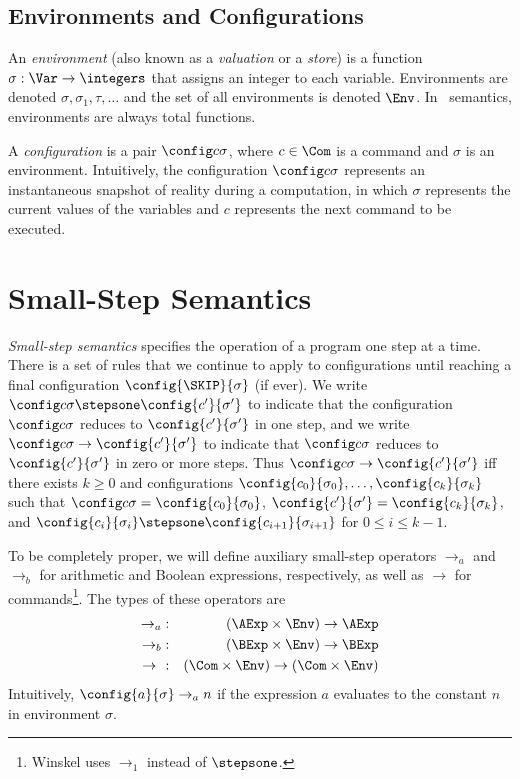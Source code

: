 \subsection{Environments and Configurations}

An \emph{environment} (also known as a \emph{valuation} or a \emph{store}) is a function $\sigma:\Var\to\integers$ that assigns an integer to each variable. Environments are denoted $\sigma,\sigma_1,\tau,\ldots$ and the set of all environments is denoted $\Env$. In \IMP\ semantics, environments are always total functions.

A \emph{configuration} is a pair $\config c\sigma$, where $c\in\Com$ is a command and $\sigma$ is an environment. Intuitively, the configuration $\config c\sigma$ represents an instantaneous snapshot of reality during a computation, in which $\sigma$ represents the current values of the variables and $c$ represents the next command to be executed.

\section{Small-Step Semantics}

\emph{Small-step semantics} specifies the operation of a program one step at a time. There is a set of rules that we continue to apply to configurations until reaching a final configuration $\config{\SKIP}{\sigma}$ (if ever). We write $\config c\sigma\stepsone\config{c'}{\sigma'}$ to indicate that the configuration $\config c\sigma$ reduces to $\config{c'}{\sigma'}$ in one step, and we write $\config c\sigma\to\config{c'}{\sigma'}$ to indicate that $\config c\sigma$ reduces to $\config{c'}{\sigma'}$ in zero or more steps. Thus $\config c\sigma\to\config{c'}{\sigma'}$ iff there exists $k\geq 0$ and configurations $\config{c_0}{\sigma_0},\ldots,\config{c_k}{\sigma_k}$ such that $\config c\sigma=\config{c_0}{\sigma_0}$, $\config{c'}{\sigma'}=\config{c_k}{\sigma_k}$, and $\config{c_i}{\sigma_i}\stepsone\config{c_{i+1}}{\sigma_{i+1}}$ for $0\leq i\leq k-1$.

To be completely proper, we will define auxiliary small-step operators $\to_a$ and $\to_b$ for arithmetic and Boolean expressions, respectively, as well as $\to$ for commands\footnote{Winskel \cite{Winskel93} uses $\to_1$ instead of $\stepsone$.}. The types of these operators are
\begin{eqnarray*}
\to_a &:& (\AExp\times\Env)\to\AExp\\
\to_b &:& (\BExp\times\Env)\to\BExp\\
\to_{\ } &:& (\Com\times\Env)\to(\Com\times\Env)
\end{eqnarray*}
Intuitively, $\config{a}{\sigma}\to_a n$ if the expression $a$ evaluates to the constant $n$ in environment $\sigma$.

